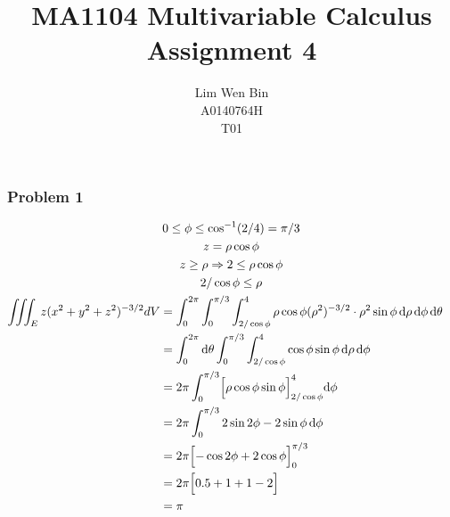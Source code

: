 \documentclass[12pt]{article}
\newcommand*\diff{\mathop{}\!\mathrm{d}}
\begin{document}
\title{MA1104 Multivariable Calculus Assignment 4}
\author{Lim Wen Bin \\
	A0140764H\\
	T01}
\maketitle

\subsubsection*{Problem 1}
\begin{gather*}
	0 \le \phi \le \cos^{-1} (2/4) = \pi/3 \\
	z = \rho\cos\phi \\
	z \ge \rho\Rightarrow 2 \le \rho\cos\phi \\
	2/\cos\phi \le \rho\\
	\begin{align*}
		\iiint_E z(x^2+y^2+z^2)^{-3/2} dV 
			&= \int_0^{2\pi} \int_0^{\pi/3} \int_{2/\cos\phi}^{4} 
				\rho\cos\phi (\rho^2)^{-3/2} \cdot \rho^2 \sin\phi
			\diff\rho \diff\phi \diff\theta &\\
		&= \int_0^{2\pi} \diff\theta 
			\int_0^{\pi/3} \int_{2/\cos\phi}^{4} 
				\cos\phi \sin\phi
			\diff\rho \diff\phi \\
		&= 2\pi
			\int_0^{\pi/3}
				\Bigl[ \rho \cos\phi \sin\phi \Bigl]_{2/\cos\phi}^{4}  
			\diff\phi \\
		&= 2\pi \int_0^{\pi/3}
				2 \sin2\phi - 2 \sin\phi
			\diff\phi \\
		&= 2\pi \Bigl[ -\cos2\phi + 2\cos\phi \Bigl]_0^{\pi/3} \\
		&= 2\pi \Bigl[ 0.5 + 1 + 1 - 2\Bigl]\\
		&= \pi
	\end{align*}
\end{gather*}
\filbreak
\end{document}
